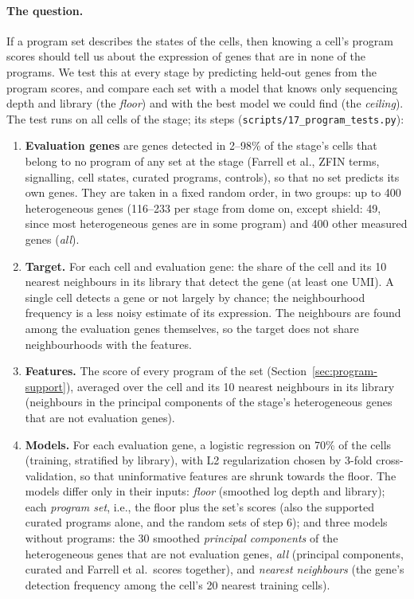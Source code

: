 \documentclass[11pt,a4paper]{article}
\begin{document}
\paragraph{The question.} If a program set describes the states of the cells, then knowing a cell's program scores should tell us about the expression of genes that are in none of the programs. We test this at every stage by predicting held-out genes from the program scores, and compare each set with a model that knows only sequencing depth and library (the \emph{floor}) and with the best model we could find (the \emph{ceiling}). The test runs on all cells of the stage; its steps (\nolinkurl{scripts/17_program_tests.py}):
\begin{enumerate}
	\item \textbf{Evaluation genes} are genes detected in 2--98\% of the stage's cells that belong to no program of any set at the stage (Farrell et al., ZFIN terms, signalling, cell states, curated programs, controls), so that no set predicts its own genes. They are taken in a fixed random order, in two groups: up to 400 heterogeneous genes (116--233 per stage from dome on, except shield: 49, since most heterogeneous genes are in some program) and 400 other measured genes (\emph{all}).
	\item \textbf{Target.} For each cell and evaluation gene: the share of the cell and its 10 nearest neighbours in its library that detect the gene (at least one UMI). A single cell detects a gene or not largely by chance; the neighbourhood frequency is a less noisy estimate of its expression. The neighbours are found among the evaluation genes themselves, so the target does not share neighbourhoods with the features.
	\item \textbf{Features.} The score of every program of the set (Section~\ref{sec:program-support}), averaged over the cell and its 10 nearest neighbours in its library (neighbours in the principal components of the stage's heterogeneous genes that are not evaluation genes).
	\item \textbf{Models.} For each evaluation gene, a logistic regression on 70\% of the cells (training, stratified by library), with L2 regularization chosen by 3-fold cross-validation, so that uninformative features are shrunk towards the floor. The models differ only in their inputs: \emph{floor} (smoothed log depth and library); each \emph{program set}, i.e., the floor plus the set's scores (also the supported curated programs alone, and the random sets of step 6); and three models without programs: the 30 smoothed \emph{principal components} of the heterogeneous genes that are not evaluation genes, \emph{all} (principal components, curated and Farrell et al.\ scores together), and \emph{nearest neighbours} (the gene's detection frequency among the cell's 20 nearest training cells).

\end{enumerate}
\end{document}
